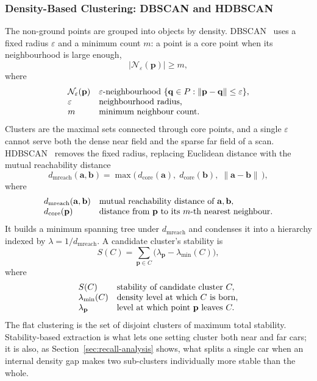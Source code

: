 \documentclass[a4paper,12pt]{report}
\begin{document}
\subsubsection{Density-Based Clustering: DBSCAN and HDBSCAN}
\label{sec:th-clustering}
The non-ground points are grouped into objects by density. DBSCAN~\cite{ester1996dbscan}
uses a fixed radius $\varepsilon$ and a minimum count $m$: a point is a core point when its
neighbourhood is large enough,
\begin{equation}
  \lvert \mathcal{N}_\varepsilon(\mathbf{p}) \rvert \ge m ,
\end{equation}
where
\[
  \begin{array}{@{}l@{\quad}l@{}}
    \mathcal{N}_\varepsilon(\mathbf{p}) & \varepsilon\text{-neighbourhood } \{\mathbf{q}\in P : \lVert\mathbf{p}-\mathbf{q}\rVert \le \varepsilon\},\\
    \varepsilon & \text{neighbourhood radius,}\\
    m & \text{minimum neighbour count.}
  \end{array}
\]
Clusters are the maximal sets connected through core points, and a single $\varepsilon$
cannot serve both the dense near field and the sparse far field of a scan.
HDBSCAN~\cite{campello2013hdbscan,mcinnes2017hdbscan} removes the fixed radius, replacing
Euclidean distance with the mutual reachability distance
\begin{equation}
  d_{\mathrm{mreach}}(\mathbf{a},\mathbf{b}) = \max\!\bigl(\, d_{\mathrm{core}}(\mathbf{a}),\; d_{\mathrm{core}}(\mathbf{b}),\; \lVert\mathbf{a}-\mathbf{b}\rVert \,\bigr),
\end{equation}
where
\[
  \begin{array}{@{}l@{\quad}l@{}}
    d_{\mathrm{mreach}}(\mathbf{a},\mathbf{b}) & \text{mutual reachability distance of } \mathbf{a},\mathbf{b},\\
    d_{\mathrm{core}}(\mathbf{p}) & \text{distance from } \mathbf{p} \text{ to its } m\text{-th nearest neighbour.}
  \end{array}
\]
It builds a minimum spanning tree under $d_{\mathrm{mreach}}$ and condenses it into a
hierarchy indexed by $\lambda = 1/d_{\mathrm{mreach}}$. A candidate cluster's stability is
\begin{equation}
  S(C) = \sum_{\mathbf{p}\in C} \bigl(\lambda_{\mathbf{p}} - \lambda_{\min}(C)\bigr),
\end{equation}
where
\[
  \begin{array}{@{}l@{\quad}l@{}}
    S(C) & \text{stability of candidate cluster } C,\\
    \lambda_{\min}(C) & \text{density level at which } C \text{ is born,}\\
    \lambda_{\mathbf{p}} & \text{level at which point } \mathbf{p} \text{ leaves } C.
  \end{array}
\]
The flat clustering is the set of disjoint clusters of maximum total stability.
Stability-based extraction is what lets one setting cluster both near and far cars; it is
also, as Section~\ref{sec:recall-analysis} shows, what splits a single car when an internal
density gap makes two sub-clusters individually more stable than the whole.
\end{document}
